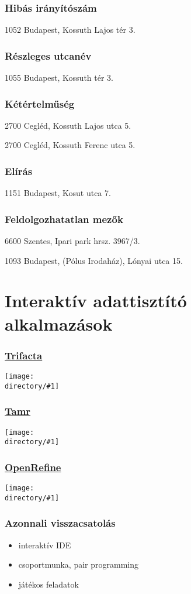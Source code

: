 \documentclass[aspectratio=169,compress,mathserif]{beamer}
\newcommand{\directory}{./exhibits}
\newcommand{\longfigure}[2]{\begin{frame}\frametitle{\hyperlink{#1back}{#2}}\hypertarget{#1}{{\begin{center}\texttt{[image: \\directory/\#1]}\end{center}}}\end{frame}}
\begin{document}
\begin{frame}\frametitle{Hibás irányítószám}\hypertarget{Hibás irányítószám}{}
\alert{1052} Budapest, Kossuth Lajos tér 3.
\end{frame}



\begin{frame}\frametitle{Részleges utcanév}\hypertarget{Részleges utcanév}{}
1055 Budapest, \alert{Kossuth} tér 3.
\end{frame}



\begin{frame}\frametitle{Kétértelműség}\hypertarget{Kétértelműség}{}
2700 Cegléd, Kossuth \alert{Lajos} utca 5.
\pause


2700 Cegléd, Kossuth \alert{Ferenc} utca 5.
\end{frame}



\begin{frame}\frametitle{Elírás}\hypertarget{Elírás}{}
1151 Budapest, \alert{Kosut} utca 7.
\end{frame}



\begin{frame}\frametitle{Feldolgozhatatlan mezők}\hypertarget{Feldolgozhatatlan mezők}{}
6600 Szentes, Ipari park \alert{hrsz. 3967/3.}
\pause


1093 Budapest, \alert{(Pólus Irodaház),} Lónyai utca 15.


\end{frame}







\section{Interaktív adattisztító alkalmazások}\hypertarget{Interaktív adattisztító alkalmazások}{}

\longfigure{trifacta}{Trifacta}
\longfigure{tamr}{Tamr}
\longfigure{openrefine}{OpenRefine}


\begin{frame}\frametitle{Azonnali visszacsatolás}\hypertarget{Azonnali visszacsatolás}{}
\begin{itemize}
\item interaktív IDE

\item csoportmunka, pair programming

\item játékos feladatok


\end{itemize}
\end{frame}
\end{document}
